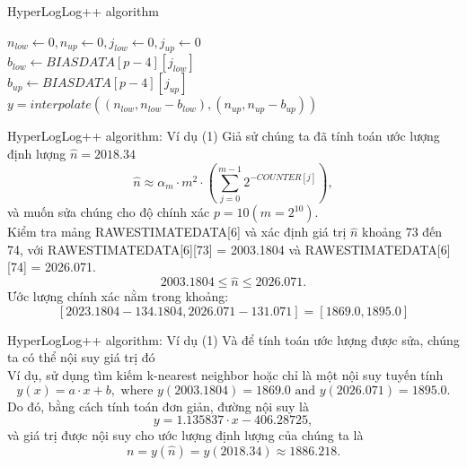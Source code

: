 \documentclass[10pt]{beamer}
\begin{document}
\begin{frame}{HyperLogLog++ algorithm}
  \begin{algorithm}[H]
    \vspace{0.25cm}
    \DontPrintSemicolon
    \LinesNumberedHidden
    \caption[]{Correcting bias in \textit{HyperLogLog++}}
    $n_{low} \gets 0, n_{up} \gets 0, j_{low} \gets 0, j_{up} \gets 0 $\\
    $b_{low} \gets BIASDATA[p-4][j_{low}]$\\
    $b_{up} \gets BIASDATA[p-4][j_{up}]$\\
    $y = interpolate\left(\left(n_{low}, n_{low} - b_{low}\right), \left(n_{up}, n_{up} - b_{up
    }\right)\right)$\\
    \vspace{0.25cm}
\end{algorithm}
\end{frame}
\begin{frame}{HyperLogLog++ algorithm: Ví dụ (1)}
  Giả sử chúng ta đã tính toán ước lượng định lượng $\hat{n} = 2018.34$
  \[
  \hat{n} \approx \alpha_m \cdot m^2 \cdot \left(\sum_{j=0}^{m-1}2^{-COUNTER[j]}\right),
  \]
  và muốn sửa chúng cho 
  độ chính xác $p = 10 (m = 2^{10})$.\\
  Kiểm tra mảng RAWESTIMATEDATA[6] và xác định giá trị $\hat{n}$ khoảng 73 đến 74,
  với RAWESTIMATEDATA[6][73] = 2003.1804 và
  RAWESTIMATEDATA[6][74] = 2026.071.
  \[2003.1804 \le \hat{n} \le 2026.071.\]
  Ước lượng chính xác nằm trong khoảng:
  \[\left[2023.1804 - 134.1804, 2026.071 - 131.071\right] = \left[1869.0, 1895.0\right]\]
\end{frame}
\begin{frame}{HyperLogLog++ algorithm: Ví dụ (1)}
  Và để tính toán ước lượng được sửa, chúng ta có thể nội suy giá trị đó\\
  Ví dụ, sử dụng tìm kiếm k-nearest neighbor hoặc chỉ là một nội suy tuyến tính
  \[y(x) = a \cdot x + b, \text{ where } y(2003.1804) = 1869.0 \text{ and } y(2026.071) = 1895.0.\]
  Do đó, bằng cách tính toán đơn giản, đường nội suy là
  \[y = 1.135837 \cdot x - 406.28725,\]
  và giá trị được nội suy cho ước lượng định lượng của chúng ta là
  \[n = y(\hat{n}) = y(2018.34) \approx 1886.218.\]
\end{frame}
\end{document}
